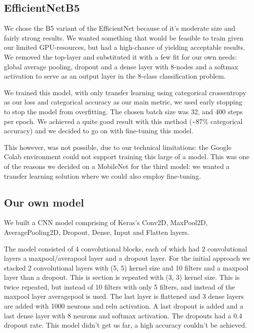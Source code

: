 \documentclass[twocolumn]{article}
\begin{document}
	\subsection{EfficientNetB5}
	
	We chose the B5 variant of the EfficientNet because of it's moderate size and fairly strong results. We wanted something that would be feasible to train given our limited GPU-resources, but had a high-chance of yielding acceptable results. We removed the top-layer and substituted it with a few fit for our own needs: global average pooling, dropout and a dense layer with 8-nodes and a softmax activation to serve as an output layer in the 8-class classification problem.
	
	We trained this model, with only transfer learning using categorical crossentropy as our loss and categorical accuracy as our main metric, we used early stopping to stop the model from overfitting. The chosen batch size was 32, and 400 steps per epoch. We achieved a quite good result with this method (\textasciitilde87\% categorical accuracy) and we decided to go on with fine-tuning this model. 
	
	This however, was not possible, due to our technical limitations: the Google Colab environment could not support training this large of a model. This was one of the reasons we decided on a MobileNet for the third model: we wanted a transfer learning solution where we could also employ fine-tuning. 
	
	\subsection{Our own model}
	We built a CNN model comprising of Keras's Conv2D, MaxPool2D, AveragePooling2D, Dropout, Dense, Input and Flatten layers.
	
	The model consisted of 4 convolutional blocks, each of which had 2 convolutional layers a maxpool/averapool layer and a dropout layer.
	For the initial approach we stacked 2 convolutional layers with (5, 5) kernel size and 10 filters and a maxpool layer than a dropout. This is section is repeated with (3, 3) kernel size. This is twice repeated, but instead of 10 filters with only 5 filters, and instead of the maxpool layer averagepool is used. The last layer is flattened and 3 dense layers are added with 1000 neurons and relu activation. A last dropout is added and a last dense layer with 8 neurons and softmax activation.
	The dropouts had a 0.4 dropout rate.
	This model didn't get us far, a high accuracy couldn't be achieved.
	
\end{document}
